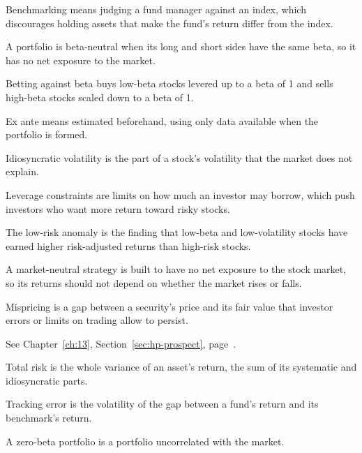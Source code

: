 \begin{keyterms}
\footnotesize
\begin{description}[leftmargin=0pt, itemsep=0pt, parsep=0pt, topsep=0pt, font=\normalfont\bfseries\color{FEMaroon}]
  \item[Benchmarking.] Benchmarking means judging a fund manager against an index, which discourages holding assets that make the fund's return differ from the index.
  \item[Beta-neutral.] A portfolio is beta-neutral when its long and short sides have the same beta, so it has no net exposure to the market.
  \item[Betting against beta (BAB).] Betting against beta buys low-beta stocks levered up to a beta of 1 and sells high-beta stocks scaled down to a beta of 1.
  \item[Ex ante.] Ex ante means estimated beforehand, using only data available when the portfolio is formed.
  \item[Idiosyncratic volatility.] Idiosyncratic volatility is the part of a stock's volatility that the market does not explain.
  \item[Leverage constraints.] Leverage constraints are limits on how much an investor may borrow, which push investors who want more return toward risky stocks.
  \item[Low-risk anomaly.] The low-risk anomaly is the finding that low-beta and low-volatility stocks have earned higher risk-adjusted returns than high-risk stocks.
  \item[Market-neutral.] A market-neutral strategy is built to have no net exposure to the stock market, so its returns should not depend on whether the market rises or falls.
  \item[Mispricing.] Mispricing is a gap between a security's price and its fair value that investor errors or limits on trading allow to persist.
  \item[Prospect theory.] See Chapter~\ref{ch:13}, Section~\ref{sec:hp-prospect}, page~\pageref{kt:prospect-theory}.
  \item[Total risk.] Total risk is the whole variance of an asset's return, the sum of its systematic and idiosyncratic parts.
  \item[Tracking error.] Tracking error is the volatility of the gap between a fund's return and its benchmark's return.
  \item[Zero-beta portfolio.] A zero-beta portfolio is a portfolio uncorrelated with the market.
\end{description}
\end{keyterms}
